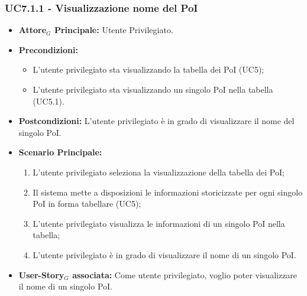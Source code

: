 \documentclass[11pt]{article}
\begin{document}
\begin{justify}
\subsubsection{\textbf{UC7.1.1 - Visualizzazione nome del PoI}}
\label{UC7.1.1}
\begin{itemize}
    \item \textbf{Attore$_G$ Principale:} Utente Privilegiato.
    \item \textbf{Precondizioni:} 
        \begin{itemize}
          \item L'utente privilegiato sta visualizzando la tabella dei PoI (UC5);
            \item L'utente privilegiato sta visualizzando un singolo PoI nella tabella (UC5.1).
        \end{itemize}
      \item \textbf{Postcondizioni:} L'utente privilegiato è in grado di visualizzare il nome del singolo PoI.
    \item \textbf{Scenario Principale:} 
        \begin{enumerate}
        \item L'utente privilegiato seleziona la visualizzazione della tabella dei PoI;
          \item Il sistema mette a disposizioni le informazioni storicizzate per ogni singolo PoI in forma tabellare (UC5);
          \item L'utente privilegiato visualizza le informazioni di un singolo PoI nella tabella;
            \item L'utente privilegiato è in grado di visualizzare il nome di un singolo PoI.
        \end{enumerate}
    \item \textbf{User-Story$_G$ associata:} Come utente privilegiato, voglio poter visualizzare il nome di un singolo PoI.
\end{itemize}


\end{justify}
\end{document}
